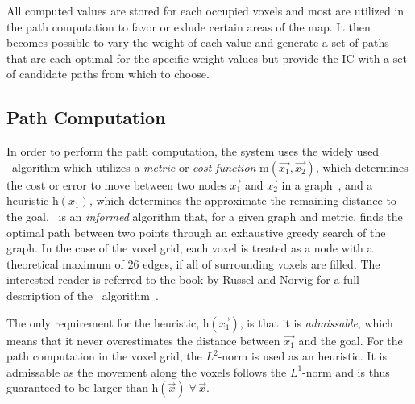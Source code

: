 All computed values are stored for each occupied voxels and most are utilized in the path computation to favor or exlude certain areas of the map.  It then becomes possible to vary the weight of each value and generate a set of paths that are each optimal for the specific weight values but provide the IC with a set of candidate paths from which to choose.


\subsection{Path Computation} \label{contributions:usar:binning}
In order to perform the path computation, the system uses the widely used \astar\ algorithm which utilizes a \emph{metric} or \emph{cost function} $\textrm{m}(\vec{x_1}, \vec{x_2})$, which determines the cost or error to move between two nodes $\vec{x_1}$ and $\vec{x_2}$ in a graph~\cite{hart1968formal}, and a heuristic $\textrm{h}(x_1)$, which determines the approximate the remaining distance to the goal.  \astar\ is an \emph{informed} algorithm that, for a given graph and metric, finds the optimal path between two points through an exhaustive greedy search of the graph.  In the case of the voxel grid, each voxel is treated as a node with a theoretical maximum of 26 edges, if all of surrounding voxels are filled.  The interested reader is referred to the book by Russel and Norvig for a full description of the \astar\ algorithm~\cite{russell1995modern}.

The only requirement for the heuristic, $\textrm{h}(\vec{x_1})$, is that it is \emph{admissable}, which means that it never overestimates the distance between $\vec{x_1}$ and the goal.  For the path computation in the voxel grid, the $L^2$-norm is used as an heuristic.  It is admissable as the movement along the voxels follows the $L^1$-norm and is thus guaranteed to be larger than $\textrm{h}(\vec{x}) \; \forall \, \vec{x}$.

